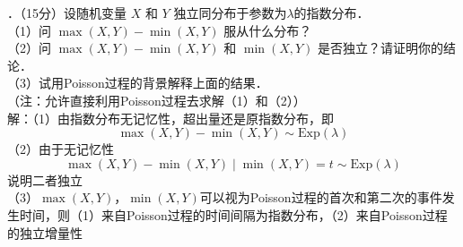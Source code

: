 \documentclass[UTF8]{ctexart}
\begin{document}
．（15分）设随机变量 $X$ 和 $Y$ 独立同分布于参数为$\lambda$的指数分布．\\
（1）问 $\max (X, Y)-\min (X, Y)$ 服从什么分布？\\
（2）问 $\max (X, Y)-\min (X, Y)$ 和 $\min (X, Y)$ 是否独立？请证明你的结论．\\
（3）试用Poisson过程的背景解释上面的结果．\\
（注：允许直接利用Poisson过程去求解（1）和（2））\\
解：（1）由指数分布无记忆性，超出量还是原指数分布，即
\[
\max (X, Y)-\min (X, Y)\sim \mathrm{Exp}(\lambda)
\]
（2）由于无记忆性
\[
\max (X, Y)-\min (X, Y) \mid \min (X, Y)=t \sim \mathrm{Exp}(\lambda)
\]
说明二者独立\\
（3）$\max (X, Y)$，$\min (X, Y)$可以视为Poisson过程的首次和第二次的事件发生时间，则（1）来自Poisson过程的时间间隔为指数分布，（2）来自Poisson过程的独立增量性\\
\end{document}
